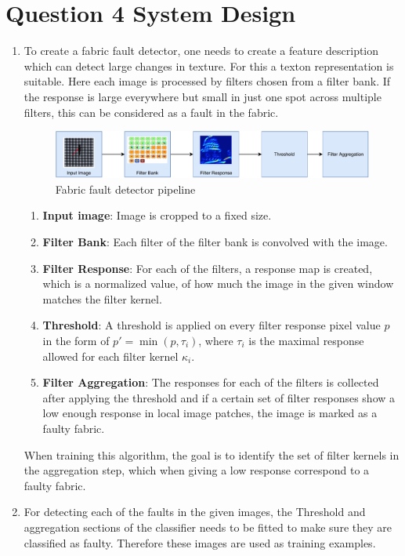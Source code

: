 \documentclass[12pt,letterpaper]{article}
\begin{document}
\section*{Question 4 System Design}
\begin{enumerate}[label=(\alph*)]
    \item To create a fabric fault detector, one needs to create a feature description which
    can detect large changes in texture. For this a texton representation is suitable.
    Here each image is processed by filters chosen from a filter bank. If the response
    is large everywhere but small in just one spot across multiple
    filters, this can be considered as a fault in the fabric.

    \begin{figure}[h!]
        \includegraphics[width=\linewidth]{fig/filters.pdf}
        \caption{Fabric fault detector pipeline}
    \end{figure}
    
    \begin{enumerate}
        \item \textbf{Input image}: Image is cropped to a fixed size.
        \item \textbf{Filter Bank}: Each filter of the filter bank is convolved with the image.
        \item \textbf{Filter Response}: For each of the filters, a response map is created, which is
        a normalized value, of how much the image in the given window matches the filter kernel.
        \item \textbf{Threshold}: A threshold is applied on every filter response pixel value \( p \)
        in the form of \( p' = \min(p, \tau_i) \), where \( \tau_i \) is the maximal response allowed for each filter kernel \( \kappa_i \).
        \item \textbf{Filter Aggregation}: The responses for each of the filters is collected 
        after applying the threshold and if a certain set of filter responses show a low enough
        response in local image patches, the image is marked as a faulty fabric.
    \end{enumerate}

    When training this algorithm, the goal is to identify the set of filter kernels
    in the aggregation step, which when giving a low response correspond to a faulty fabric.

    \item For detecting each of the faults in the given images, 
        the Threshold and aggregation sections of the classifier needs to be fitted to
        make sure they are classified as faulty. Therefore these images are used as training examples.
\end{enumerate}
\end{document}

